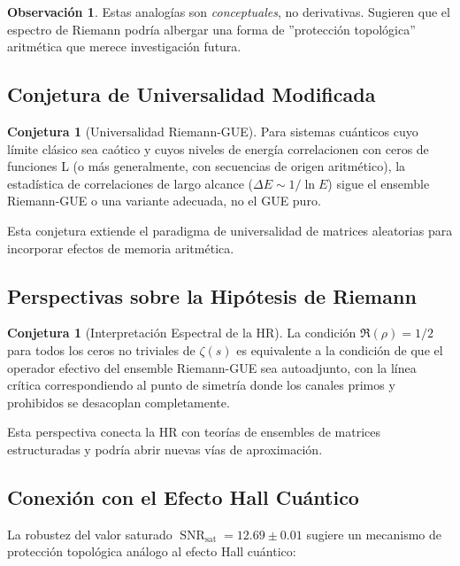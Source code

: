 \documentclass[12pt, a4paper]{article}
\theoremstyle{plain}
\theoremstyle{definition}
\newtheorem{observacion}[teorema]{Observación}
\newtheorem{conjetura}[teorema]{Conjetura}
\theoremstyle{remark}
\newcommand{\SNR}{\operatorname{SNR}}
\begin{document}
\begin{observacion}
Estas analogías son \textit{conceptuales}, no derivativas. Sugieren que el espectro de Riemann podría albergar una forma de ''protección topológica'' aritmética que merece investigación futura.
\end{observacion}

\subsection{Conjetura de Universalidad Modificada}
\label{subsec:universalidad_modificada}

\begin{conjetura}[Universalidad Riemann-GUE]
Para sistemas cuánticos cuyo límite clásico sea caótico y cuyos niveles de energía correlacionen con ceros de funciones L (o más generalmente, con secuencias de origen aritmético), la estadística de correlaciones de largo alcance ($\Delta E \sim 1/\ln E$) sigue el ensemble Riemann-GUE o una variante adecuada, no el GUE puro.
\end{conjetura}

Esta conjetura extiende el paradigma de universalidad de matrices aleatorias para incorporar efectos de memoria aritmética.

\subsection{Perspectivas sobre la Hipótesis de Riemann}
\label{subsec:perspectivas_hr}

\begin{conjetura}[Interpretación Espectral de la HR]
La condición $\Re(\rho)=1/2$ para todos los ceros no triviales de $\zeta(s)$ es equivalente a la condición de que el operador efectivo del ensemble Riemann-GUE sea autoadjunto, con la línea crítica correspondiendo al punto de simetría donde los canales primos y prohibidos se desacoplan completamente.
\end{conjetura}

Esta perspectiva conecta la HR con teorías de ensembles de matrices estructuradas y podría abrir nuevas vías de aproximación.

\subsection{Conexión con el Efecto Hall Cuántico}
\label{subsec:quantum_hall}

La robustez del valor saturado $\SNR_{\text{sat}} = 12.69 \pm 0.01$ sugiere 
un mecanismo de protección topológica análogo al efecto Hall cuántico:
\end{document}
